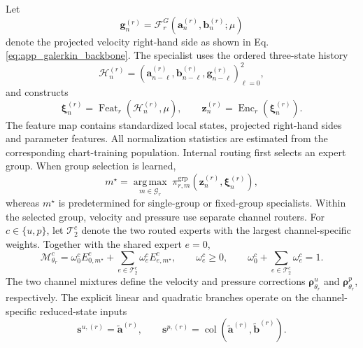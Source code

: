 Let
\begin{equation}
  \bm g_n^{(r)}
  =
  \mathcal F_r^G
  \left(
    \bm a_n^{(r)},\bm b_n^{(r)};\mu
  \right)
  \label{eq:app_galerkin_feature}
\end{equation}
denote the projected velocity right-hand side as shown in Eq.\ref{eq:app_galerkin_backbone}. The specialist uses the ordered three-state history
\begin{equation}
  \mathcal H_n^{(r)}
  =
  \left(
    \bm a_{n-\ell}^{(r)},
    \bm b_{n-\ell}^{(r)},
    \bm g_{n-\ell}^{(r)}
  \right)_{\ell=0}^{2},
  \label{eq:app_specialist_history}
\end{equation}
and constructs
\begin{equation}
  \bm\xi_n^{(r)}
  =
  \operatorname{Feat}_r
  \left(
    \mathcal H_n^{(r)},\mu
  \right),
  \qquad
  \bm z_n^{(r)}
  =
  \operatorname{Enc}_r
  \left(
    \bm\xi_n^{(r)}
  \right).
  \label{eq:app_specialist_features}
\end{equation}
The feature map contains standardized local states, projected
right-hand sides and parameter features. All normalization statistics are estimated from the corresponding chart-training population. Internal routing first selects an expert group. When group selection is learned,
\begin{equation}
  m^\star
  =
  \underset{m\in\mathcal G_r}{\operatorname{arg\,max}}
  \;
  \pi_{r,m}^{\mathrm{grp}}
  \left(
    \bm z_n^{(r)},\bm\xi_n^{(r)}
  \right),
  \label{eq:app_group_top1}
\end{equation}
whereas $m^\star$ is predetermined for single-group or fixed-group
specialists. Within the selected group, velocity and pressure use separate channel routers. For $c\in\{u,p\}$, let $\mathcal T_2^c$ denote the two routed experts with the largest channel-specific weights. Together with the shared expert $e=0$,
\begin{equation}
  \mathcal M_{\theta_r}^c
  =
  \omega_0^c
  E_{0,m^\star}^c
  +
  \sum_{e\in\mathcal T_2^c}
  \omega_e^c
  E_{e,m^\star}^c,
  \qquad
  \omega_e^c\ge0,
  \qquad
  \omega_0^c+\sum_{e\in\mathcal T_2^c}\omega_e^c=1.
  \label{eq:app_channel_sparse_moe}
\end{equation}
The two channel mixtures define the velocity and pressure corrections
$\bm\rho_{\theta_r}^u$ and $\bm\rho_{\theta_r}^p$, respectively. The explicit linear and quadratic branches operate on the channel-specific reduced-state inputs
\begin{equation}
  \bm s^{u,(r)}
  =
  \widetilde{\bm a}^{(r)},
  \qquad
  \bm s^{p,(r)}
  =
  \operatorname{col}
  \left(
    \widetilde{\bm a}^{(r)},
    \widetilde{\bm b}^{(r)}
  \right).
  \label{eq:app_expert_state_slices}
\end{equation}
